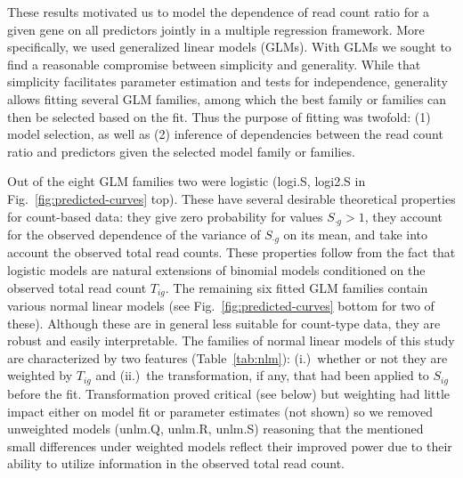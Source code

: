 \documentclass[letterpaper]{article}
\begin{document}
These results motivated us to model the dependence of read count ratio for a
given gene on all predictors jointly in a multiple regression framework.  More
specifically, we used generalized linear models (GLMs).  With GLMs we sought
to find a reasonable compromise between simplicity and generality.  While that
simplicity facilitates parameter estimation and tests for independence,
generality allows fitting several GLM families, among which the best family or
families can then be selected based on the fit.  Thus the purpose of fitting
was twofold: (1) model selection, as well as (2) inference of dependencies
between the read count ratio and predictors given the selected model family or
families.

Out of the eight GLM families two were logistic (logi.S, logi2.S in
Fig.~\ref{fig:predicted-curves} top).  These have several desirable
theoretical properties for count-based data: they give zero probability for
values \(S_{\cdot g}>1\), they account for the observed dependence of the
variance of \(S_{\cdot g}\) on its mean, and take into account the observed
total read counts.  These properties follow from the fact that logistic models
are natural extensions of binomial models conditioned on the observed total
read count \(T_{ig}\).  The remaining six fitted GLM families contain various
normal linear models (see Fig.~\ref{fig:predicted-curves} bottom for two of
these).  Although these are in general less suitable for count-type data, they
are robust and easily interpretable. The families of normal linear models of
this study are characterized by two features (Table~\ref{tab:nlm}):
(i.)~whether or not they are weighted by \(T_{ig}\) and (ii.)~the
transformation, if any, that had been applied to \(S_{ig}\) before the fit.
Transformation proved critical (see below) but weighting had little impact
either on model fit or parameter estimates (not shown) so we removed
unweighted models (unlm.Q, unlm.R, unlm.S) reasoning that the mentioned small
differences under weighted models reflect their improved power due to their
ability to utilize information in the observed total read count.
\end{document}
